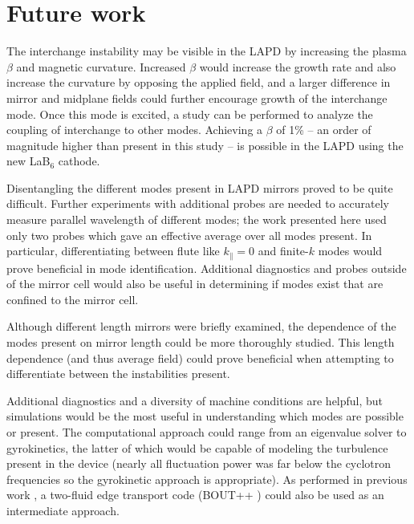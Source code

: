
\section{Future work}

The interchange instability may be visible in the LAPD by increasing the plasma $\beta$ and magnetic curvature. Increased $\beta$ would increase the growth rate and also increase the curvature by opposing the applied field, and a larger difference in mirror and midplane fields could further encourage growth of the interchange mode. Once this mode is excited, a study can be performed to analyze the coupling of interchange to other modes. Achieving a $\beta$ of 1\% -- an order of magnitude higher than present in this study -- is possible in the LAPD using the new LaB$_6$ cathode. 

Disentangling the different modes present in LAPD mirrors proved to be quite difficult. Further experiments with additional probes are needed to accurately measure parallel wavelength of different modes; the work presented here used only two probes which gave an effective average over all modes present. In particular, differentiating between flute like $k_\parallel=0$ and finite-$k$ modes would prove beneficial in mode identification. Additional diagnostics and probes outside of the mirror cell would also be useful in determining if modes exist that are confined to the mirror cell. 

Although different length mirrors were briefly examined, the dependence of the modes present on mirror length could be more thoroughly studied. This length dependence (and thus average field) could prove beneficial when attempting to differentiate between the instabilities present. 

Additional diagnostics and a diversity of machine conditions are helpful, but simulations would be the most useful in understanding which modes are possible or present. The computational approach could range from an eigenvalue solver to gyrokinetics, the latter of which would be capable of modeling the turbulence present in the device (nearly all fluctuation power was far below the cyclotron frequencies so the gyrokinetic approach is appropriate). As performed in previous work \cite{Friedman_2013}, a two-fluid edge transport code (BOUT++ \cite{dudson_bout_2009}) could also be used as an intermediate approach. 

